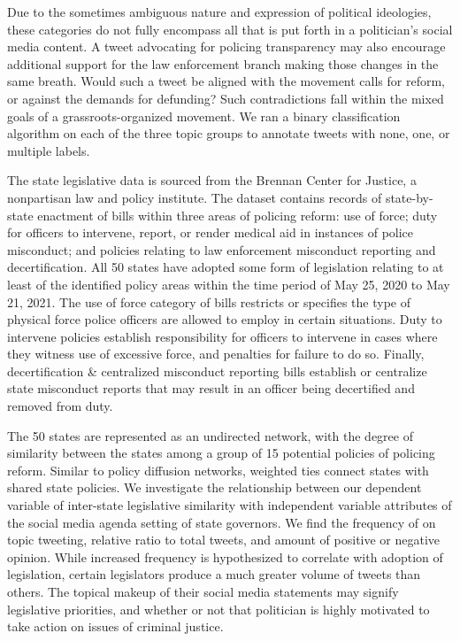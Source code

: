 \documentclass[12pt]{article}
\begin{document}
Due to the sometimes ambiguous nature and expression of political
ideologies, these categories do not fully encompass all that is put
forth in a politician's social media content. A tweet advocating for
policing transparency may also encourage additional support for the law
enforcement branch making those changes in the same breath. Would such a
tweet be aligned with the movement calls for reform, or against the
demands for defunding? Such contradictions fall within the mixed goals
of a grassroots-organized movement. We ran a binary classification
algorithm on each of the three topic groups to annotate tweets with
none, one, or multiple labels.

The state legislative data is sourced from the Brennan Center for
Justice, a nonpartisan law and policy institute. The dataset contains
records of state-by-state enactment of bills within three areas of
policing reform: use of force; duty for officers to intervene, report,
or render medical aid in instances of police misconduct; and policies
relating to law enforcement misconduct reporting and decertification.
All 50 states have adopted some form of legislation relating to at least
of the identified policy areas within the time period of May 25, 2020 to
May 21, 2021. The use of force category of bills restricts or specifies
the type of physical force police officers are allowed to employ in
certain situations. Duty to intervene policies establish responsibility
for officers to intervene in cases where they witness use of excessive
force, and penalties for failure to do so. Finally, decertification \&
centralized misconduct reporting bills establish or centralize state
misconduct reports that may result in an officer being decertified and
removed from duty.

The 50 states are represented as an undirected network, with the degree
of similarity between the states among a group of 15 potential policies
of policing reform. Similar to policy diffusion networks, weighted ties
connect states with shared state policies. We investigate the
relationship between our dependent variable of inter-state legislative
similarity with independent variable attributes of the social media
agenda setting of state governors. We find the frequency of on topic
tweeting, relative ratio to total tweets, and amount of positive or
negative opinion. While increased frequency is hypothesized to correlate
with adoption of legislation, certain legislators produce a much greater
volume of tweets than others. The topical makeup of their social media
statements may signify legislative priorities, and whether or not that
politician is highly motivated to take action on issues of criminal
justice.



\end{document}
